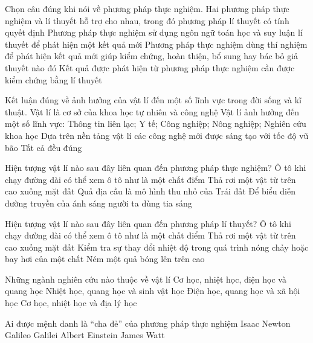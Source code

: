 \begin{ex}
	Chọn câu đúng khi nói về phương pháp thực nghiệm.
	\choice
	{Hai phương pháp thực nghiệm và lí thuyết hỗ trợ cho nhau, trong đó phương pháp lí thuyết có tính quyết định}
	{Phương pháp thực nghiệm sử dụng ngôn ngữ toán học và suy luận lí thuyết để phát hiện một kết quả mới}
	{\True Phương pháp thực nghiệm dùng thí nghiệm để phát hiện kết quả mới giúp kiểm chứng, hoàn thiện, bổ sung hay bác bỏ giả thuyết nào đó}
	{Kết quả được phát hiện từ phương pháp thực nghiệm cần được kiểm chứng bằng lí thuyết}
	\loigiai{}
\end{ex}

\begin{ex}
	Kết luận đúng về ảnh hưởng của vật lí đến một số lĩnh vực trong đời sống và kĩ thuật.
	\choice
	{Vật lí là cơ sở của khoa học tự nhiên và công nghệ}
	{Vật lí ảnh hưởng đến một số lĩnh vực: Thông tin liên lạc; Y tế; Công nghiệp; Nông nghiệp; Nghiên cứu khoa học}
	{Dựa trên nền tảng vật lí các công nghệ mới được sáng tạo với tốc độ vũ bão}
	{\True Tất cả đều đúng}
	\loigiai{}
\end{ex}

\begin{ex}
	Hiện tượng vật lí nào sau đây liên quan đến phương pháp thực nghiệm?
	\choice
	{Ô tô khi chạy đường dài có thể xem ô tô như là một chất điểm}
	{\True Thả rơi một vật từ trên cao xuống mặt đất}
	{Quả địa cầu là mô hình thu nhỏ của Trái đất}
	{Để biểu diễn đường truyền của ánh sáng người ta dùng tia sáng}
	\loigiai{}
\end{ex}

\begin{ex}
	Hiện tượng vật lí nào sau đây liên quan đến phương pháp lí thuyết?
	\choice
	{\True Ô tô khi chạy đường dài có thể xem ô tô như là một chất điểm}
	{Thả rơi một vật từ trên cao xuống mặt đất}
	{Kiểm tra sự thay đổi nhiệt độ trong quá trình nóng chảy hoặc bay hơi của một chất}
	{Ném một quả bóng lên trên cao}
	\loigiai{}
\end{ex}

\begin{ex}
	Những ngành nghiên cứu nào thuộc về vật lí
	\choice
	{\True Cơ học, nhiệt học, điện học và quang học}
	{Nhiệt học, quang học và sinh vật học}
	{Điện học, quang học và xã hội học}
	{Cơ học, nhiệt học và địa lý học}
	\loigiai{}
\end{ex}

\begin{ex}
	Ai được mệnh danh là “cha đẻ” của phương pháp thực nghiệm
	\choice
	{Isaac Newton}
	{\True Galileo Galilei}
	{Albert Einstein}
	{James Watt}
	\loigiai{}
\end{ex}

